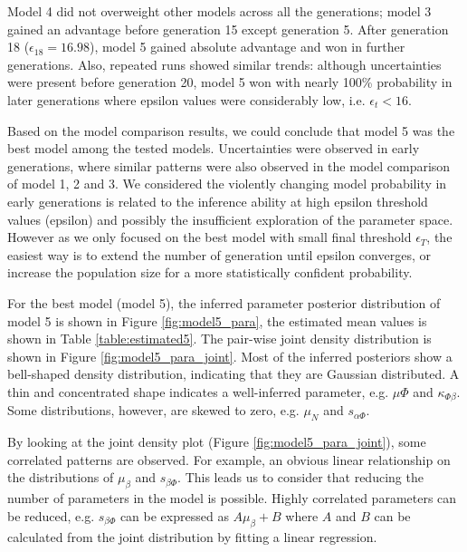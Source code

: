 Model 4 did not overweight other models across all the generations; model 3 gained an advantage before generation 15 except generation 5. After generation 18 ($\epsilon_{18} = 16.98$), model 5 gained absolute advantage and won in further generations. Also, repeated runs showed similar trends: although uncertainties were present before generation 20, model 5 won with nearly 100\% probability in later generations where epsilon values were considerably low, i.e. $\epsilon_t<16$.

Based on the model comparison results, we could conclude that model 5 was the best model among the tested models. Uncertainties were observed in early generations, where similar patterns were also observed in the model comparison of model 1, 2 and 3. We considered the violently changing model probability in early generations is related to the inference ability at high epsilon threshold values (epsilon) and possibly the insufficient exploration of the parameter space. However as we only focused on the best model with small final threshold $\epsilon_T$, the easiest way is to extend the number of generation until epsilon converges, or increase the population size for a more statistically confident probability.




For the best model (model 5), the inferred parameter posterior distribution of model 5 is shown in Figure \ref{fig:model5_para}, the estimated mean values is shown in Table \ref{table:estimated5}. The pair-wise joint density distribution is shown in Figure \ref{fig:model5_para_joint}. Most of the inferred posteriors show a bell-shaped density distribution, indicating that they are Gaussian distributed. A thin and concentrated shape indicates a well-inferred parameter, e.g. $\mu{\Phi}$ and $\kappa_{\Phi\beta}$. Some distributions, however, are skewed to zero, e.g. $\mu_N$ and $s_{\alpha\Phi}$.

By looking at the joint density plot (Figure \ref{fig:model5_para_joint}), some correlated patterns are observed. For example, an obvious linear relationship on the distributions of $\mu_\beta$ and $s_{\beta\Phi}$. This leads us to consider that reducing the number of parameters in the model is possible. Highly correlated parameters can be reduced, e.g. $s_{\beta\Phi}$ can be expressed as $A\mu_\beta+B$ where $A$ and $B$ can be calculated from the joint distribution by fitting a linear regression.

